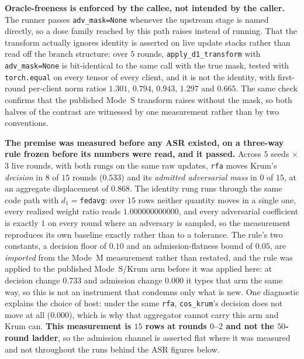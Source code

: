 \documentclass{article}
\begin{document}
\textbf{Oracle-freeness is enforced by the callee, not intended by the caller.} The runner passes \texttt{adv\_mask=None} whenever the upstream stage is named directly, so a dose family reached by this path raises instead of running. That the transform actually ignores identity is asserted on live update stacks rather than read off the branch structure: over $5$ rounds, \texttt{apply\_d1\_transform} with \texttt{adv\_mask=None} is bit-identical to the same call with the true mask, tested with \texttt{torch.equal} on every tensor of every client, and it is not the identity, with first-round per-client norm ratios $1.301$, $0.794$, $0.943$, $1.297$ and $0.665$. The same check confirms that the published Mode~S transform raises without the mask, so both halves of the contrast are witnessed by one measurement rather than by two conventions.

\textbf{The premise was measured before any ASR existed, on a three-way rule frozen before its numbers were read, and it passed.} Across $5$ seeds $\times$ $3$ live rounds, with both rungs on the same raw updates, \texttt{rfa} moves Krum's \emph{decision} in $8$ of $15$ rounds ($0.533$) and its \emph{admitted adversarial mass} in $0$ of $15$, at an aggregate displacement of $0.868$. The identity rung runs through the same code path with $d_1{=}$\texttt{fedavg}: over $15$ rows neither quantity moves in a single one, every realized weight ratio reads $1.000000000000$, and every adversarial coefficient is exactly $1$ on every round where an adversary is sampled, so the measurement reproduces its own baseline exactly rather than to a tolerance. The rule's two constants, a decision floor of $0.10$ and an admission-flatness bound of $0.05$, are \emph{imported} from the Mode~M measurement rather than restated, and the rule was applied to the published Mode~S/Krum arm before it was applied here: at decision change $0.733$ and admission change $0.000$ it types that arm the same way, so this is not an instrument that condemns only what is new. One diagnostic explains the choice of host: under the same \texttt{rfa}, \texttt{cos\_krum}'s decision does not move at all ($0.000$), which is why that aggregator cannot carry this arm and Krum can. \textbf{This measurement is $15$ rows at rounds $0$--$2$ and not the $50$-round ladder}, so the admission channel is asserted flat where it was measured and not throughout the runs behind the ASR figures below.
\end{document}
